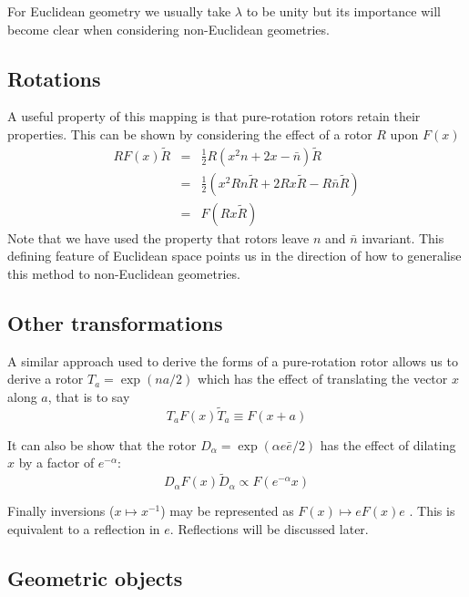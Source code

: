 For Euclidean geometry we usually take $\lambda$ to be unity but its
importance will become clear when considering non-Euclidean geometries.

\subsection{Rotations}

A useful property of this mapping is that pure-rotation rotors 
retain their properties.
This can be shown by considering the effect of a rotor $R$ upon $F(x)$
\begin{eqnarray*}
RF(x)\tilde{R} & = & \frac{1}{2}R(x^2n + 2x - \bar{n}) \tilde{R}\\
& = & \frac{1}{2}\left(x^2Rn\tilde{R} + 2Rx\tilde{R} - R\bar{n}\tilde{R}\right) \\
& = & F(Rx\tilde{R})
\end{eqnarray*}
Note that we have used the property that rotors leave $n$ and $\bar{n}$
invariant.
This defining feature of Euclidean space points us in the direction
of how to generalise this method to non-Euclidean geometries.

\subsection{Other transformations}

A similar approach used to derive the forms of a pure-rotation
rotor allows us to derive a
rotor $T_a = \exp (na/2)$ which has the effect of translating the vector
$x$ along $a$, that is to say
\begin{displaymath}
T_a F(x) \tilde{T}_a \equiv F(x + a)
\end{displaymath}

It can also be show that the rotor $D_\alpha = \exp (\alpha e \bar{e} / 2)$ has
the effect of dilating $x$ by a factor of $e^{-\alpha}$:
\begin{displaymath}
D_\alpha F(x) \tilde{D}_\alpha \propto F(e^{-\alpha} x)
\end{displaymath}

Finally inversions ($x \mapsto x^{-1}$) may be represented as 
$F(x) \mapsto eF(x)e$ 
\cite{wareham_lasenby}. This is equivalent to a reflection in $e$. Reflections
will be discussed later.

\subsection{Geometric objects}

